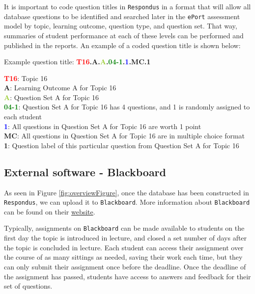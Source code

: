 \documentclass[11pt,a4paper,oldfontcommands,openany]{memoir}
\numberwithin{equation}{section} %
\begin{document}
It is important to code question titles in \texttt{Respondus} in a format that will allow all database questions to be identified and searched later in the \texttt{ePort} assessment model by topic, learning outcome, question type, and question set. That way, summaries of student performance at each of these levels can be performed and published in the reports. An example of a coded question title is shown below:

\begin{framed}
Example question title: \textbf{\textcolor{Red}{T16}.\textcolor{YellowOrange}{A}.\textcolor{YellowGreen}{A}.\textcolor{Green}{04-1}.\textcolor{blue}{1}.\textcolor{RedViolet}{MC}.\textcolor{VioletRed}{1}}

\textbf{\textcolor{Red}{T16}}: Topic 16\\
\textbf{\textcolor{YellowOrange}{A}}: Learning Outcome A for Topic 16\\
\textbf{\textcolor{YellowGreen}{A}}: Question Set A for Topic 16\\
\textbf{\textcolor{Green}{04-1}}: Question Set A for Topic 16 has 4 questions, and 1 is randomly assigned to each student\\
\textbf{\textcolor{blue}{1}}: All questions in Question Set A for Topic 16 are worth 1 point\\
\textbf{\textcolor{RedViolet}{MC}}: All questions in Question Set A for Topic 16 are in multiple choice format\\
\textbf{\textcolor{VioletRed}{1}}: Question label of this particular question from Question Set A for Topic 16\\
\vspace{-3mm}
\end{framed}

\subsection{External software - Blackboard}

As seen in Figure \ref{fig:overviewFigure}, once the database has been constructed in \texttt{Respondus}, we can upload it to \texttt{Blackboard}. More information about \texttt{Blackboard} can be found on their \href{http://www.blackboard.com/}{website}.

Typically, assignments on \texttt{Blackboard} can be made available to students on the first day the topic is introduced in lecture, and closed a set number of days after the topic is concluded in lecture. Each student can access their assignment over the course of as many sittings as needed, saving their work each time, but they can only submit their assignment once before the deadline. Once the deadline of the assignment has passed, students have access to answers and feedback for their set of questions. 
\end{document}
